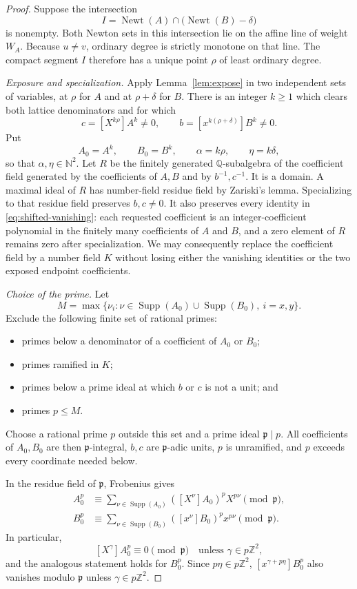 \documentclass[11pt]{article}
\newcommand{\N}{\mathbb N}
\newcommand{\Q}{\mathbb Q}
\newcommand{\Z}{\mathbb Z}
\newcommand{\Newt}{\operatorname{Newt}}
\newcommand{\Supp}{\operatorname{Supp}}
\begin{document}
\begin{proof}
Suppose the intersection
\[
 I=\Newt(A)\cap\bigl(\Newt(B)-\delta\bigr)
\]
is nonempty.  Both Newton sets in this intersection lie on the affine line
of weight $W_A$.  Because $u\ne v$, ordinary degree is strictly monotone
on that line.  The compact segment $I$ therefore has a unique point
$\rho$ of least ordinary degree.

\emph{Exposure and specialization.}
Apply Lemma~\ref{lem:expose} in two independent sets of variables, at
$\rho$ for $A$ and at $\rho+\delta$ for $B$.  There is an integer $k\geq1$
which clears both lattice denominators and for which
\[
 c=[X^{k\rho}]A^k\ne0,
 \qquad b=[x^{k(\rho+\delta)}]B^k\ne0.
\]
Put
\[
 A_0=A^k,\qquad B_0=B^k,
 \qquad \alpha=k\rho,\qquad \eta=k\delta,
\]
so that $\alpha,\eta\in\N^2$.  Let $R$ be the finitely generated
$\Q$-subalgebra of the coefficient field generated by the coefficients of
$A,B$ and by $b^{-1},c^{-1}$.  It is a domain.  A maximal ideal of
$R$ has number-field residue field by Zariski's lemma.  Specializing to
that residue field preserves $b,c\ne0$.  It also preserves every identity
in \eqref{eq:shifted-vanishing}: each requested coefficient is an
integer-coefficient polynomial in the finitely many coefficients of $A$
and $B$, and a zero element of $R$ remains zero after specialization.
We may consequently replace the coefficient field by a number field $K$
without losing either the vanishing identities or the two exposed endpoint
coefficients.

\emph{Choice of the prime.}
Let
\[
 M=\max\{\nu_i:\nu\in\Supp(A_0)\cup\Supp(B_0),\ i=x,y\}.
\]
Exclude the following finite set of rational primes:
\begin{itemize}
 \item primes below a denominator of a coefficient of $A_0$ or $B_0$;
 \item primes ramified in $K$;
 \item primes below a prime ideal at which $b$ or $c$ is not a unit; and
 \item primes $p\leq M$.
\end{itemize}
Choose a rational prime $p$ outside this set and a prime ideal
$\mathfrak p\mid p$.  All coefficients of $A_0,B_0$ are then
$\mathfrak p$-integral, $b,c$ are $\mathfrak p$-adic units, $p$ is
unramified, and $p$ exceeds every coordinate needed below.

In the residue field of $\mathfrak p$, Frobenius gives
\begin{align}
 A_0^p&\equiv\sum_{\nu\in\Supp(A_0)}
   ([X^\nu]A_0)^pX^{p\nu}\pmod{\mathfrak p},
 \label{eq:frobenius-a}\\
 B_0^p&\equiv\sum_{\nu\in\Supp(B_0)}
   ([x^\nu]B_0)^px^{p\nu}\pmod{\mathfrak p}.
 \label{eq:frobenius-b}
\end{align}
In particular,
\[
 [X^\gamma]A_0^p\equiv0\pmod{\mathfrak p}
 \quad\text{unless }\gamma\in p\Z^2,
\]
and the analogous statement holds for $B_0^p$.  Since $p\eta\in p\Z^2$,
$[x^{\gamma+p\eta}]B_0^p$ also vanishes modulo $\mathfrak p$ unless
$\gamma\in p\Z^2$.


\end{proof}
\end{document}
